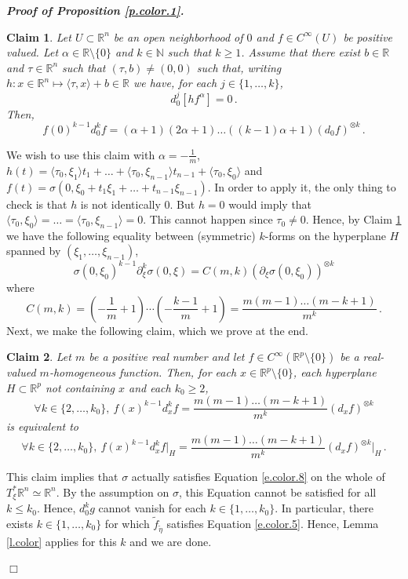 \documentclass[10pt,twoside]{article}
\newcommand{\R}{\mathbb{R}}
\newcommand{\N}{\mathbb{N}}
\newenvironment{prf}[1][]
{\vskip 2mm  {\it \bf Proof#1. }}{$\Box$ \vskip 2mm}
\numberwithin{theorem}{section}
\newtheorem{claim}{Claim}
\begin{document}
\begin{prf}[ of Proposition \ref{p.color.1}]
\begin{claim}\label{cl.color.1}
Let $U\subset\R^n$ be an open neighborhood of $0$ and $f\in C^\infty(U)$ be positive valued. Let $\alpha\in\R\setminus\{0\}$ and $k\in\N$ such that $k\geq 1$. Assume that there exist $b\in\R$ and $\tau\in\R^n$ such that $(\tau,b)\neq (0,0)$ such that, writing $h:x\in\R^n\mapsto \langle\tau,x\rangle+b\in\R$ we have, for each $j\in\{1,\dots,k\}$,
\begin{equation}\label{e.color.1}
d^j_0[hf^\alpha]=0\, .
\end{equation}
Then,
\begin{equation}\label{e.color.2}
f(0)^{k-1}d^k_0f = (\alpha+1)(2\alpha+1)\dots((k-1)\alpha+1)(d_0f)^{\otimes k}\, .
\end{equation}
\end{claim}

We wish to use this claim with $\alpha=-\frac{1}{m}$, $h(t)=\langle \tau_0,\xi_1\rangle t_1+\dots+\langle \tau_0,\xi_{n-1}\rangle t_{n-1}+\langle\tau_0,\xi_0\rangle$ and $f(t)=\sigma(0,\xi_0+t_1\xi_1+\dots+t_{n-1}\xi_{n-1})$. In order to apply it, the only thing to check is that $h$ is not identically $0$. But $h=0$ would imply that $\langle \tau_0,\xi_0\rangle=\dots=\langle\tau_0,\xi_{n-1}\rangle=0$. This cannot happen since $\tau_0\neq 0$. Hence, by Claim \ref{cl.color.1} we have the following equality between (symmetric) $k$-forms on the hyperplane $H$ spanned by $(\xi_1,\dots,\xi_{n-1})$,
\begin{equation}\label{e.color.8}
\sigma(0,\xi_0)^{k-1}\partial^k_\xi\sigma(0,\xi)=C(m,k)(\partial_\xi\sigma(0,\xi_0))^{\otimes k}
\end{equation}
where
\[
C(m,k)=\left(-\frac{1}{m}+1\right)\cdots\left(-\frac{k-1}{m}+1\right)=\frac{m(m-1)\dots(m-k+1)}{m^k}\, .
\]
Next, we make the following claim, which we prove at the end.
\begin{claim}\label{cl.color}
Let $m$ be a positive real number and let $f\in C^\infty(\R^p\setminus\{0\})$ be a real-valued $m$-homogeneous function. Then, for each $x\in\R^p\setminus\{0\}$, each hyperplane $H\subset\R^p$ not containing $x$ and each $k_0\geq 2$,
\begin{equation}\label{e.color.9}
\forall k\in\{2,\dots,k_0\},\ f(x)^{k-1}d^k_xf=\frac{m(m-1)\dots(m-k+1)}{m^k}(d_xf)^{\otimes k}
\end{equation}
is equivalent to
\begin{equation}\label{e.color.10}
\forall k\in\{2,\dots,k_0\},\ f(x)^{k-1}d^k_xf\big|_H=\frac{m(m-1)\dots(m-k+1)}{m^k}(d_xf)^{\otimes k}\big|_H\, .
\end{equation}
\end{claim}
This claim implies that $\sigma$ actually satisfies Equation \eqref{e.color.8} on the whole of $T^*_\xi\R^n\simeq\R^n$. By the assumption on $\sigma$, this Equation cannot be satisfied for all $k\leq k_0$. Hence, $d^k_0g$ cannot vanish for each $k\in\{1,\dots,k_0\}$. In particular, there exists $k\in\{1,\dots,k_0\}$ for which $\tilde{f}_{\tilde{\eta}}$ satisfies Equation \eqref{e.color.5}. Hence, Lemma \ref{l.color} applies for this $k$ and we are done.


\end{prf}
\end{document}
